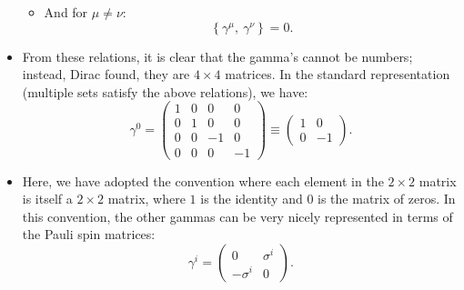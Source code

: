\begin{itemize}
\begin{itemize}
            \item And for $\mu \neq \nu$:
                \begin{equation}
                    \left\{\gamma^{\mu},\ \gamma^{\nu}\right\} = 0.
                \end{equation}
        \end{itemize}
    \item From these relations, it is clear that the gamma's cannot be numbers; instead, Dirac found, they are $4\times4$ matrices. In the standard representation (multiple sets satisfy the above relations), we have:
        \begin{equation}
            \gamma^0 = 
                \begin{pmatrix}
                    1 & 0 & 0  & 0 \\
                    0 & 1 & 0  & 0 \\
                    0 & 0 & -1 & 0 \\
                    0 & 0 & 0  & -1
                \end{pmatrix} 
                \equiv 
                \begin{pmatrix}
                    1 & 0 \\
                    0 & -1
                \end{pmatrix}.
        \end{equation}
    \item Here, we have adopted the convention where each element in the $2\times2$ matrix is itself a $2\times2$ matrix, where $1$ is the identity and $0$ is the matrix of zeros. In this convention, the other gammas can be very nicely represented in terms of the Pauli spin matrices:
        \begin{equation}
            \gamma^i =
                \begin{pmatrix}
                    0 & \sigma^i \\
                    -\sigma^i & 0
                \end{pmatrix}.
        \end{equation}
\end{itemize}





